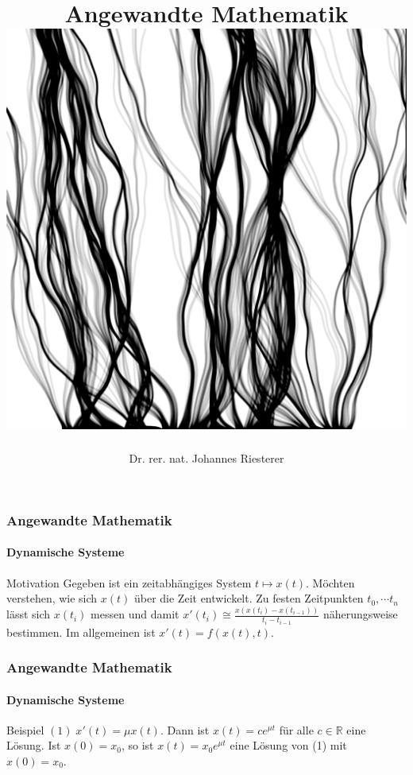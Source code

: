 \documentclass{beamer}
\begin{document}
\title[Angewandte Mathematik] %
{Angewandte Mathematik
\\
\includegraphics[scale=0.15]{images/cover}
}
\subtitle{}
\author[Dr. Johannes Riesterer] %
{Dr.  rer. nat. Johannes Riesterer}

\date[KPT 2004] %
{}

\subject{Angewandte Mathematik}



\frame{\titlepage}



\begin{frame}
    \frametitle{Angewandte Mathematik}
\framesubtitle{Dynamische Systeme }
\begin{block}{Motivation}
Gegeben ist ein zeitabhängiges System $t \mapsto x(t)$. 
Möchten verstehen, wie sich $x(t)$ über die Zeit entwickelt. 
Zu festen Zeitpunkten $t_0, \cdots t_n $ lässt sich $x(t_i)$ messen und damit $x'(t_i) \cong \frac{x(x(t_i) - x(t_{i-1}))}{t_i - t_{i-1}}$ näherungsweise bestimmen. Im allgemeinen ist $x'(t) = f(x(t), t)$. 
\end{block}
 \end{frame}

\begin{frame}
    \frametitle{Angewandte Mathematik}
\framesubtitle{Dynamische Systeme }
\begin{block}{Beispiel}
$(1) \;x'(t) = \mu x(t)$.  
Dann ist $x(t)= c e^{\mu t}$ für alle $c \in \mathbb{R}$ eine Lösung. Ist $x(0) = x_0$, so ist   $x(t)= x_0 e^{\mu t}$ eine Lösung von (1) mit $x(0) = x_0$. 
\end{block}
 \end{frame}
\end{document}

